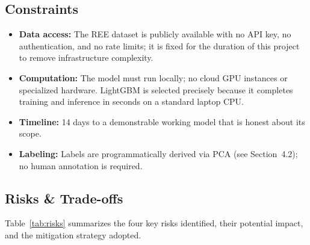 \documentclass[11pt, a4paper]{article}
\begin{document}
\subsection{Constraints}

\begin{itemize}
  \item \textbf{Data access:} The REE dataset is publicly available with
        no API key, no authentication, and no rate limits; it is fixed for
        the duration of this project to remove infrastructure complexity.
  \item \textbf{Computation:} The model must run locally; no
        cloud GPU instances or specialized hardware. LightGBM is selected precisely because it completes training and inference in seconds on a standard laptop CPU.
  \item \textbf{Timeline:} 14 days to a demonstrable working model that
        is honest about its scope.
  \item \textbf{Labeling:} Labels are programmatically derived via PCA (see Section~4.2); no human annotation is required.
\end{itemize}

\subsection{Risks \& Trade-offs}

Table~\ref{tab:risks} summarizes the four key risks identified, their
potential impact, and the mitigation strategy adopted.
\end{document}
